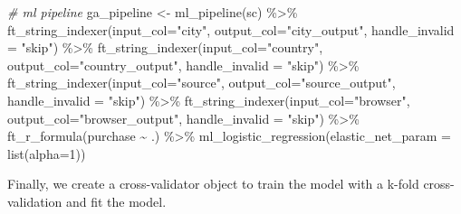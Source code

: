 \documentclass[
  12pt,
]{style/krantz}
\newenvironment{Shaded}{\begin{snugshade}}{\end{snugshade}}
\newcommand{\AttributeTok}[1]{\textcolor[rgb]{0.77,0.63,0.00}{#1}}
\newcommand{\CommentTok}[1]{\textcolor[rgb]{0.56,0.35,0.01}{\textit{#1}}}
\newcommand{\DecValTok}[1]{\textcolor[rgb]{0.00,0.00,0.81}{#1}}
\newcommand{\FunctionTok}[1]{\textcolor[rgb]{0.00,0.00,0.00}{#1}}
\newcommand{\NormalTok}[1]{#1}
\newcommand{\OtherTok}[1]{\textcolor[rgb]{0.56,0.35,0.01}{#1}}
\newcommand{\SpecialCharTok}[1]{\textcolor[rgb]{0.00,0.00,0.00}{#1}}
\newcommand{\StringTok}[1]{\textcolor[rgb]{0.31,0.60,0.02}{#1}}
\begin{document}
\begin{Shaded}
\begin{Highlighting}[]
\CommentTok{\# ml pipeline}
\NormalTok{ga\_pipeline }\OtherTok{\textless{}{-}} 
     \FunctionTok{ml\_pipeline}\NormalTok{(sc) }\SpecialCharTok{\%\textgreater{}\%}
     \FunctionTok{ft\_string\_indexer}\NormalTok{(}\AttributeTok{input\_col=}\StringTok{"city"}\NormalTok{, }
                       \AttributeTok{output\_col=}\StringTok{"city\_output"}\NormalTok{,}
                       \AttributeTok{handle\_invalid =} \StringTok{"skip"}\NormalTok{) }\SpecialCharTok{\%\textgreater{}\%}
     \FunctionTok{ft\_string\_indexer}\NormalTok{(}\AttributeTok{input\_col=}\StringTok{"country"}\NormalTok{, }
                       \AttributeTok{output\_col=}\StringTok{"country\_output"}\NormalTok{,}
                       \AttributeTok{handle\_invalid =} \StringTok{"skip"}\NormalTok{) }\SpecialCharTok{\%\textgreater{}\%}
     \FunctionTok{ft\_string\_indexer}\NormalTok{(}\AttributeTok{input\_col=}\StringTok{"source"}\NormalTok{, }
                       \AttributeTok{output\_col=}\StringTok{"source\_output"}\NormalTok{,}
                       \AttributeTok{handle\_invalid =} \StringTok{"skip"}\NormalTok{) }\SpecialCharTok{\%\textgreater{}\%}
     \FunctionTok{ft\_string\_indexer}\NormalTok{(}\AttributeTok{input\_col=}\StringTok{"browser"}\NormalTok{, }
                       \AttributeTok{output\_col=}\StringTok{"browser\_output"}\NormalTok{,}
                       \AttributeTok{handle\_invalid =} \StringTok{"skip"}\NormalTok{) }\SpecialCharTok{\%\textgreater{}\%}
     \FunctionTok{ft\_r\_formula}\NormalTok{(purchase }\SpecialCharTok{\textasciitilde{}}\NormalTok{ .) }\SpecialCharTok{\%\textgreater{}\%} 
     \FunctionTok{ml\_logistic\_regression}\NormalTok{(}\AttributeTok{elastic\_net\_param =} \FunctionTok{list}\NormalTok{(}\AttributeTok{alpha=}\DecValTok{1}\NormalTok{))}
\end{Highlighting}
\end{Shaded}

Finally, we create a cross-validator object to train the model with a k-fold cross-validation and fit the model.
\end{document}
